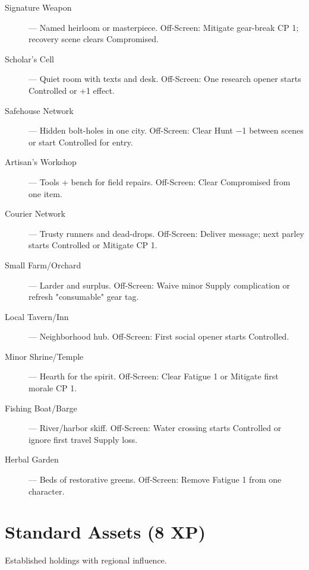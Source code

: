 \begin{description}
  \item[Signature Weapon] — Named heirloom or masterpiece. Off-Screen: Mitigate gear-break CP 1; recovery scene clears Compromised.
  \item[Scholar's Cell] — Quiet room with texts and desk. Off-Screen: One research opener starts Controlled or +1 effect.
  \item[Safehouse Network] — Hidden bolt-holes in one city. Off-Screen: Clear Hunt −1 between scenes or start Controlled for entry.
  \item[Artisan's Workshop] — Tools + bench for field repairs. Off-Screen: Clear Compromised from one item.
  \item[Courier Network] — Trusty runners and dead-drops. Off-Screen: Deliver message; next parley starts Controlled or Mitigate CP 1.
  \item[Small Farm/Orchard] — Larder and surplus. Off-Screen: Waive minor Supply complication or refresh "consumable" gear tag.
  \item[Local Tavern/Inn] — Neighborhood hub. Off-Screen: First social opener starts Controlled.
  \item[Minor Shrine/Temple] — Hearth for the spirit. Off-Screen: Clear Fatigue 1 or Mitigate first morale CP 1.
  \item[Fishing Boat/Barge] — River/harbor skiff. Off-Screen: Water crossing starts Controlled or ignore first travel Supply loss.
  \item[Herbal Garden] — Beds of restorative greens. Off-Screen: Remove Fatigue 1 from one character.
\end{description}

\section{Standard Assets (8 XP)}

Established holdings with regional influence.

